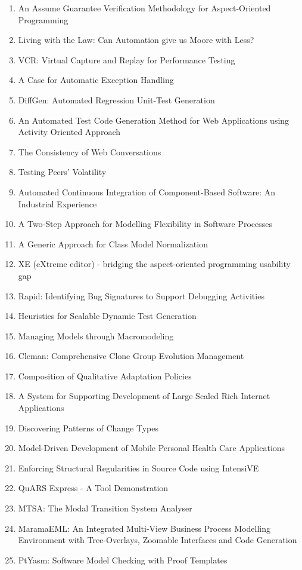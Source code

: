 \begin{enumerate}[itemsep=-1ex]
  \item An Assume Guarantee Verification Methodology for Aspect-Oriented Programming
  \item Living with the Law: Can Automation give us Moore with Less?
  \item VCR: Virtual Capture and Replay for Performance Testing
  \item A Case for Automatic Exception Handling
  \item DiffGen: Automated Regression Unit-Test Generation
  \item An Automated Test Code Generation Method for Web Applications using Activity Oriented Approach
  \item The Consistency of Web Conversations
  \item Testing Peers' Volatility
  \item Automated Continuous Integration of Component-Based Software: An Industrial Experience
  \item A Two-Step Approach for Modelling Flexibility in Software Processes
  \item A Generic Approach for Class Model Normalization
  \item XE (eXtreme editor) - bridging the aspect-oriented programming usability gap
  \item Rapid: Identifying Bug Signatures to Support Debugging Activities
  \item Heuristics for Scalable Dynamic Test Generation
  \item Managing Models through Macromodeling
  \item Cleman: Comprehensive Clone Group Evolution Management
  \item Composition of Qualitative Adaptation Policies
  \item A System for Supporting Development of Large Scaled Rich Internet Applications
  \item Discovering Patterns of Change Types
  \item Model-Driven Development of Mobile Personal Health Care Applications
  \item Enforcing Structural Regularities in Source Code using IntensiVE
  \item QuARS Express - A Tool Demonstration
  \item MTSA: The Modal Transition System Analyser
  \item MaramaEML: An Integrated Multi-View Business Process Modelling Environment with Tree-Overlays, Zoomable Interfaces and Code Generation
  \item PtYasm: Software Model Checking with Proof Templates

\end{enumerate}
